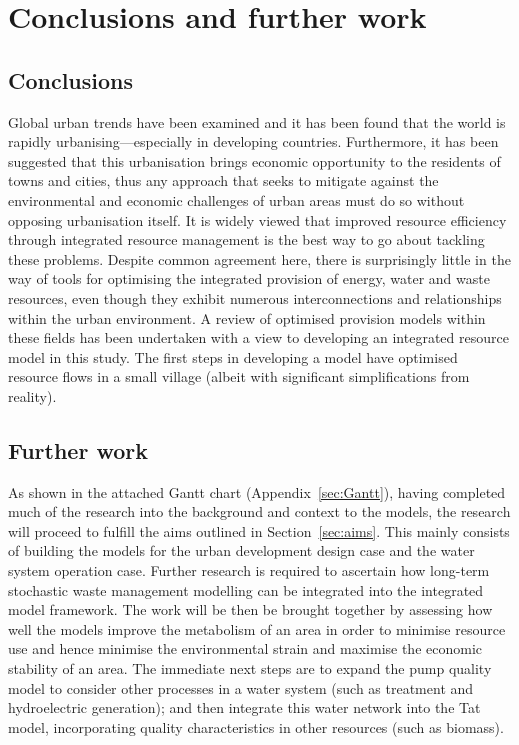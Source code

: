 \section{Conclusions and further work}
\label{sec:conc}

\subsection{Conclusions}
Global urban trends have been examined and it has been found that the world is rapidly urbanising---especially in developing countries. Furthermore, it has been suggested that this urbanisation brings economic opportunity to the residents of towns and cities, thus any approach that seeks to mitigate against the environmental and economic challenges of urban areas must do so without opposing urbanisation itself. It is widely viewed that improved resource efficiency through integrated resource management is the best way to go about tackling these problems. Despite common agreement here, there is surprisingly little in the way of tools for optimising the integrated provision of energy, water and waste resources, even though they exhibit numerous interconnections and relationships within the urban environment. A review of optimised provision models within these fields has been undertaken with a view to developing an integrated resource model in this study. The first steps in developing a model have optimised resource flows in a small village (albeit with significant simplifications from reality). 

\subsection{Further work}
As shown in the attached Gantt chart (Appendix~\ref{sec:Gantt}), having completed much of the research into the background and context to the models, the research will proceed to fulfill the aims outlined in Section~\ref{sec:aims}. This mainly consists of building the models for the urban development design case and the water system operation case. Further research is required to ascertain how long-term stochastic waste management modelling can be integrated into the integrated model framework. The work will be then be brought together by assessing how well the models improve the metabolism of an area in order to minimise resource use and hence minimise the environmental strain and maximise the economic stability of an area. The immediate next steps are to expand the pump quality model to consider other processes in a water system (such as treatment and hydroelectric generation); and then integrate this water network into the Tat model, incorporating quality characteristics in other resources (such as biomass).

